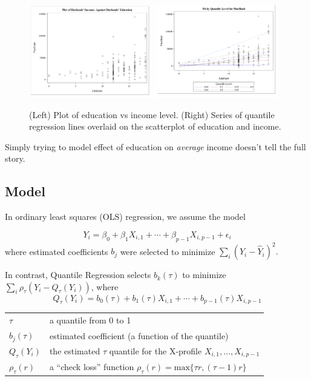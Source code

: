 \documentclass[12pt]{notes}
\begin{document}
\begin{figure}[H]
\includegraphics[width=0.48\textwidth]{figures/module7/education_scatter.png}
\includegraphics[width=0.48\textwidth]{figures/module7/education_scatter_2.png}
\caption{(Left) Plot of education vs income level. (Right) Series of quantile regression lines overlaid on the scatterplot of education and income.}
\label{fig:edscatter}
\end{figure}

\begin{minipage}[l][2cm][c]{\textwidth}

\end{minipage}

\nspace 
Simply trying to model effect of education on \textit{average} income doesn't tell the full story. 

\subsection{Model}
In ordinary least squares (OLS) regression, we assume the model 

$$Y_i = \beta_0 + \beta_1X_{i, 1} + \cdots + \beta_{p-1}X_{i, p-1} + \epsilon_i$$ where estimated coefficients $b_j$ were selected to minimize $\sum_i\left(Y_i - \hat{Y}_i\right)^2.$

\nspace
In contrast, Quantile Regression selects $b_k(\tau)$ to minimize $\sum_i\rho_\tau\left(Y_i - Q_\tau(Y_i)\right)$, where
$$Q_\tau(Y_i) = b_0(\tau) + b_1(\tau)X_{i, 1} + \cdots + b_{p-1}(\tau)X_{i, p-1}$$
\begin{tabular}{ll}
$\tau$ & a quantile from 0 to 1 \\
$b_j(\tau)$ & estimated coefficient (a function of the quantile) \\
$Q_\tau(Y_i)$ & the estimated $\tau$ quantile for the X-profile $X_{i, 1}, \ldots, X_{i, p-1}$ \\
$\rho_\tau(r)$ & a ``check loss'' function $\rho_\tau(r) = \text{max}\{\tau r, (\tau - 1)r\}$
\end{tabular}
\end{document}
